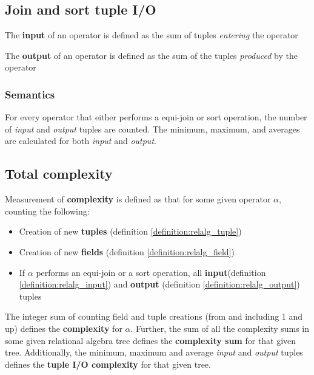 \subsection{Join and sort tuple I/O}
\begin{myDefinition}
The \textbf{input} of an operator is defined as the sum of tuples \emph{entering} the
operator
\label{definition:relalg_input}
\end{myDefinition}

\begin{myDefinition}
The \textbf{output} of an operator is defined as the sum of the tuples \emph{produced}
by the operator
\label{definition:relalg_output}
\end{myDefinition}

\subsubsection{Semantics}
For every operator that either performs a equi-join or sort operation, the
number of \textit{input} and \textit{output} tuples are counted. The minimum, maximum,
and averages are calculated for both \textit{input} and \textit{output}.

\subsection{Total complexity}
\begin{myDefinition}
Measurement of \textbf{complexity} is defined as that for some given
operator $\alpha$, counting the following:
\begin{itemize}
  \item Creation of new \textbf{tuples} (definition
  \ref{definition:relalg_tuple})
  \item Creation of new \textbf{fields} (definition
  \ref{definition:relalg_field})
  \item If $\alpha$ performs an equi-join or a sort operation, all
  \textbf{input}(definition \ref{definition:relalg_input}) and \textbf{output}
  (definition \ref{definition:relalg_output}) tuples
\end{itemize}
The integer sum of counting field and tuple creations (from and including 1 and
up) defines the \textbf{complexity} for $\alpha$. Further, the
sum of all the complexity sums in some given relational algebra tree defines the
\textbf{complexity sum} for that given tree. Additionally, the minimum, maximum
and average \textit{input} and \textit{output} tuples defines the
\textbf{tuple I/O complexity} for that given tree.
\label{definition:relalg_complexity}
\end{myDefinition}
